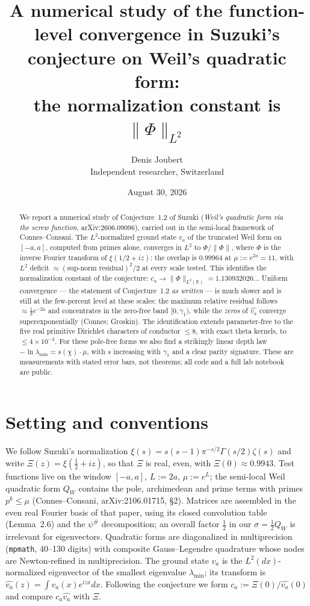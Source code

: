 \documentclass[10pt]{article}
\title{\bfseries A numerical study of the function-level convergence in Suzuki's
conjecture on Weil's quadratic form:\\ the normalization constant is $\lVert\Phi\rVert_{L^2}$}
\author{Denis Joubert\\ \small Independent researcher, Switzerland}
\date{August 30, 2026}
\newcommand{\R}{\mathbb{R}}
\newcommand{\norm}[1]{\lVert #1\rVert}
\begin{document}
\maketitle

\begin{abstract}
\noindent
We report a numerical study of Conjecture~1.2 of Suzuki
(\emph{Weil's quadratic form via the screw function}, arXiv:2606.09096),
carried out in the semi-local framework of Connes--Consani. The
$L^2$-normalized ground state $v_a$ of the truncated Weil form on
$[-a,a]$, computed from primes alone, converges in $L^2$ to
$\Phi/\norm{\Phi}$, where $\Phi$ is the inverse Fourier transform of
$\xi(1/2+iz)$: the overlap is $0.99964$ at $\mu:=e^{2a}=11$, with
$L^2$ deficit $\approx(\text{sup-norm residual})^2/2$ at every scale
tested. This identifies the normalization constant of the conjecture:
$c_a\to\norm{\Phi}_{L^2(\R)}=1.130932026\ldots$ Uniform convergence ---
the statement of Conjecture~1.2 \emph{as written} --- is much slower and
is still at the few-percent level at these scales: the maximum relative
residual follows $\approx\frac{1}{3}e^{-2a}$ and concentrates in the
zero-free band $[0,\gamma_1)$, while the \emph{zeros} of
$\widehat{v_a}$ converge superexponentially (Connes; Groskin). The identification extends
parameter-free to the five real primitive Dirichlet characters of
conductor $\le 8$, with exact theta kernels, to $\le 4\times10^{-4}$.
For these pole-free forms we also find a strikingly linear depth law
$-\ln\lambda_{\min}=s(\chi)\cdot\mu$, with $s$ increasing with
$\gamma_1$ and a clear parity signature. These are measurements with
stated error bars, not theorems; all code and a full lab notebook are
public.
\end{abstract}

\section{Setting and conventions}

We follow Suzuki's normalization $\xi(s)=s(s-1)\pi^{-s/2}\Gamma(s/2)\zeta(s)$
and write $\Xi(z)=\xi(\tfrac12+iz)$, so that $\Xi$ is real, even, with
$\Xi(0)\approx0.9943$. Test functions live on the window $[-a,a]$,
$L:=2a$, $\mu:=e^{L}$; the semi-local Weil quadratic form $Q_W$ contains
the pole, archimedean and prime terms with primes $p^k\le\mu$
(Connes--Consani, arXiv:2106.01715, \S2). Matrices are assembled in the
even real Fourier basis of that paper, using its closed convolution
table (Lemma~2.6) and the $\psi^{\#}$ decomposition; an overall factor
$\tfrac12$ in our $\sigma=\tfrac12 Q_W$ is irrelevant for eigenvectors.
Quadratic forms are diagonalized in multiprecision (\texttt{mpmath},
40--130 digits) with composite Gauss--Legendre quadrature whose nodes
are Newton-refined in multiprecision. The ground state $v_a$ is the
$L^2(dx)$-normalized eigenvector of the smallest eigenvalue
$\lambda_{\min}$; its transform is $\widehat{v_a}(z)=\int v_a(x)e^{izx}dx$.
Following the conjecture we form $c_a:=\Xi(0)/\widehat{v_a}(0)$ and
compare $c_a\widehat{v_a}$ with $\Xi$.
\end{document}
